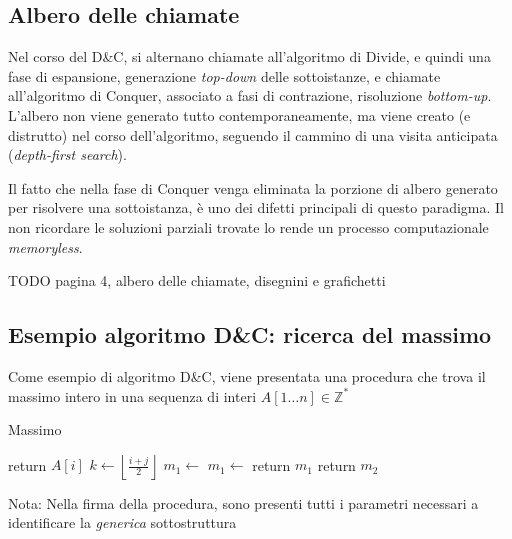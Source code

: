 \subsection{Albero delle chiamate}
\label{sss:alberochiamate}
Nel corso del D\&C, si alternano chiamate all'algoritmo di Divide, e quindi una fase di espansione, generazione \textit{top-down} delle sottoistanze, e chiamate all'algoritmo di Conquer, associato a fasi di contrazione, risoluzione \textit{bottom-up}. L'albero non viene generato tutto contemporaneamente, ma viene creato (e distrutto) nel corso dell'algoritmo, seguendo il cammino di una visita anticipata (\textit{depth-first search}).

Il fatto che nella fase di Conquer venga eliminata la porzione di albero generato per risolvere una sottoistanza, è uno dei difetti principali di questo paradigma. Il non ricordare le soluzioni parziali trovate lo rende un processo computazionale \textit{memoryless}.

TODO pagina 4, albero delle chiamate, disegnini e grafichetti

\subsection{Esempio algoritmo D\&C: ricerca del massimo}

Come esempio di algoritmo D\&C, viene presentata una procedura che trova il massimo intero in una sequenza di interi $A[1 \dots n] \in \mathbb{Z}^*$

\begin{algorithm}[H]
\caption{Massimo}\label{alg:max}
\begin{algorithmic}[1]
                                     
            \State return $A[i]$
        \EndIf
        \State $k \gets \left\lfloor \frac{i+j}{2} \right\rfloor$    
        \State $m_1 \gets $  
        \State $m_1 \gets $ 
                      
            \State return $m_1$
        \Else
            \State return $m_2$
        \EndIf
    \EndProcedure
\end{algorithmic}
\end{algorithm}

Nota: Nella firma della procedura, sono presenti tutti i parametri necessari a identificare la \textit{generica} sottostruttura

